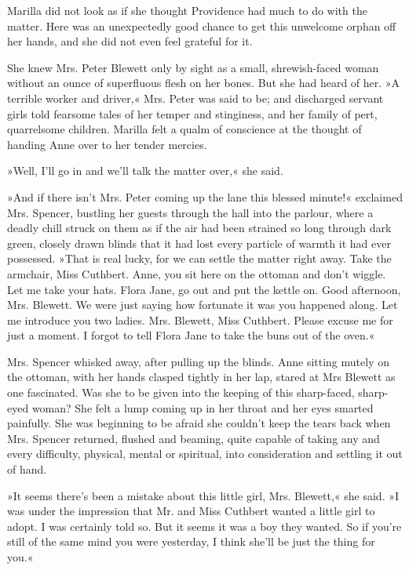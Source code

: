 Marilla did not look as if she thought Providence had much to do with the matter. Here was an unexpectedly good chance to get this unwelcome orphan off her hands, and she did not even feel grateful for it.

She knew Mrs. Peter Blewett only by sight as a small, shrewish-faced woman without an ounce of superfluous flesh on her bones. But she had heard of her. »A terrible worker and driver,« Mrs. Peter was said to be; and discharged servant girls told fearsome tales of her temper and stinginess, and her family of pert, quarrelsome children. Marilla felt a qualm of conscience at the thought of handing Anne over to her tender mercies.

»Well, I'll go in and we'll talk the matter over,« she said.

»And if there isn't Mrs. Peter coming up the lane this blessed minute!« exclaimed Mrs. Spencer, bustling her guests through the hall into the parlour, where a deadly chill struck on them as if the air had been strained so long through dark green, closely drawn blinds that it had lost every particle of warmth it had ever possessed. »That is real lucky, for we can settle the matter right away. Take the armchair, Miss Cuthbert. Anne, you sit here on the ottoman and don't wiggle. Let me take your hats. Flora Jane, go out and put the kettle on. Good afternoon, Mrs. Blewett. We were just saying how fortunate it was you happened along. Let me introduce you two ladies. Mrs. Blewett, Miss Cuthbert. Please excuse me for just a moment. I forgot to tell Flora Jane to take the buns out of the oven.«

Mrs. Spencer whisked away, after pulling up the blinds. Anne sitting mutely on the ottoman, with her hands clasped tightly in her lap, stared at Mrs Blewett as one fascinated. Was she to be given into the keeping of this sharp-faced, sharp-eyed woman? She felt a lump coming up in her throat and her eyes smarted painfully. She was beginning to be afraid she couldn't keep the tears back when Mrs. Spencer returned, flushed and beaming, quite capable of taking any and every difficulty, physical, mental or spiritual, into consideration and settling it out of hand.

»It seems there's been a mistake about this little girl, Mrs. Blewett,« she said. »I was under the impression that Mr. and Miss Cuthbert wanted a little girl to adopt. I was certainly told so. But it seems it was a boy they wanted. So if you're still of the same mind you were yesterday, I think she'll be just the thing for you.«

